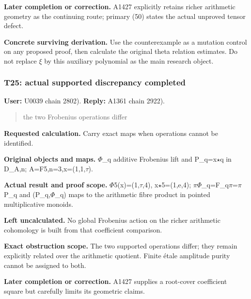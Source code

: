 \documentclass[10pt,a4paper,oneside]{report}
\begin{document}
\textbf{Later completion or correction.} A1427 explicitly retains richer
arithmetic geometry as the continuing route; primary (50) states the
actual unproved tensor defect.

\textbf{Concrete surviving derivation.} Use the counterexample as a
mutation control on any proposed proof, then calculate the original
theta relation estimates. Do not replace
\allowbreak{}\ensuremath{ξ}\allowbreak{} by this auxiliary polynomial as
the main research object.

\subsubsection{T25: actual supported discrepancy
completed}\label{t25-actual-supported-discrepancy-completed}

\textbf{User:} U0039
\protect{} chain 2802).
\textbf{Reply:} A1361
\protect{} chain 2922).

\begin{quote}
the two Frobenius operations differ
\end{quote}

\textbf{Requested calculation.} Carry exact maps when operations cannot
be identified.

\textbf{Original objects and maps.}
\allowbreak{}\ensuremath{Φ}\allowbreak{}\_q additive Frobenius lift and
P\_q=x\allowbreak{}\ensuremath{⋆}\allowbreak{}q in D\_A,n;
A=F5,n=3,x=(1,1,\allowbreak{}\ensuremath{τ}\allowbreak{}).

\textbf{Actual result and proof scope.}
\allowbreak{}\ensuremath{Φ}\allowbreak{}5(x)=(1,\allowbreak{}\ensuremath{τ}\allowbreak{},4),
x\allowbreak{}\ensuremath{⋆}\allowbreak{}5=(1,e,4);
\allowbreak{}\ensuremath{π}\allowbreak{}\allowbreak{}\ensuremath{Φ}\allowbreak{}\_q=F\_q\allowbreak{}\ensuremath{π}\allowbreak{}=\allowbreak{}\ensuremath{π}\allowbreak{}P\_q
and (P\_q,\allowbreak{}\ensuremath{Φ}\allowbreak{}\_q) maps to the
arithmetic fibre product in pointed multiplicative monoids.

\textbf{Left uncalculated.} No global Frobenius action on the richer
arithmetic cohomology is built from that coefficient comparison.

\textbf{Exact obstruction scope.} The two supported operations differ;
they remain explicitly related over the arithmetic quotient. Finite
étale amplitude purity cannot be assigned to both.

\textbf{Later completion or correction.} A1427 supplies a root-cover
coefficient square but carefully limits its geometric claims.
\end{document}
